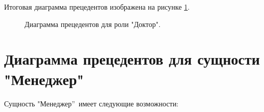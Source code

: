 \documentclass[14pt]{extreport}
\begin{document}
        Итоговая диаграмма прецедентов изображена на рисунке \ref{doctor_uml}.

        \begin{figure}[H]%
            \centering
            \caption{Диаграмма прецедентов для роли "Доктор".} \label{doctor_uml}
        \end{figure} 
    
    \section{Диаграмма прецедентов для сущности "Менеджер"\ }
        Сущность "Менеджер”\ имеет следующие возможности:
\end{document}
